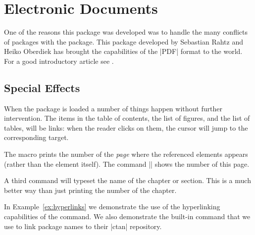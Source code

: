 \chapter{Electronic Documents}
\label{ch:hyperlinks}

One of the reasons this package was developed was to handle the many conflicts of packages with the
 package. This package developed by Sebastian Rahtz and Heiko Oberdiek \citeyearpar{hyperref}
has brought the capabilities of the |PDF| format to the \tex world. For a good introductory article
see \cite{garcia}.

\section{Special Effects}

When the package is loaded a number of things happen without further intervention.  The items in the table of contents, the list of
figures, and the list of tables, will be links: when
the reader clicks on them, the cursor will jump
to the corresponding target.


\begin{macro}{\pageref}
\begin{macro}{\nameref}
\label{hyperref01}
The macro \CMDI{\pageref} prints the number of the \emph{page} where the referenced elements appears (rather
than the element itself). The command |\pageref{label}|  \pageref{hyperref01} shows the number of this page.

A third command \CMDI{\nameref} will typeset the name of the chapter or section. This is a much better way than
just printing the number of the chapter.
\end{macro}
\end{macro}

In Example~\ref{ex:hyperlinks} we demonstrate the use of the hyperlinking capabilities of the \cmd{\nameref}
command.  We
also demonstrate the built-in command \CMDI{\pkgname} that we use to link package names to their |ctan| repository.

